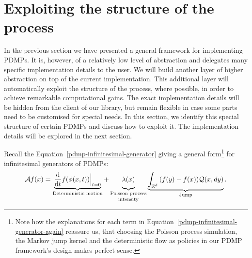 \documentclass[report.tex]{subfiles}
\begin{document}
\section{Exploiting the structure of the process}
\label{exploiting-structure-of-pdmp}

In the previous section we have presented a general framework for implementing
PDMPs.
It is, however, of a relatively low level of abstraction and delegates many specific
implementation details to the user.
We will build another layer
of higher abstraction on top of the current implementation.
This additional layer will automatically exploit the structure of the process,
where possible, in order to achieve remarkable computational gains.
The exact implementation details will be hidden from the client of our library,
but remain flexible in case some parts need to be customised for special needs.
In this section, we identify this special structure of certain PDMPs
and discuss how to exploit it.
The implementation details will be explored in the next section.

Recall the Equation~\ref{pdmp-infinitesimal-generator} giving a general form\footnote{
Note how the explanations for each term in Equation~\ref{pdmp-infinitesimal-generator-again}
reassure us, that
choosing the Poisson process simulation, the Markov jump kernel and the deterministic
flow as policies in our PDMP framework's design makes perfect sense.
} for infinitesimal generators of PDMPs:
\begin{equation}
  \label{pdmp-infinitesimal-generator-again}
  \mathcal{A}f(x) =
  \underbrace{\dv{}{t}f(\phi(x, t)) \Bigr|_{t = 0}}_\text{Deterministic motion} +
  \underbrace{\lambda(x)\vphantom{\Bigr|_{t=0}}}_\text{\shortstack{Poisson process \\ intensity}}
  \underbrace{\myintNoVariable{\mathbb{R}^{d}}{}{}{(f(y) - f(x))\mathcal{Q}(x, dy)}}_\text{Jump}.
\end{equation}
\end{document}
